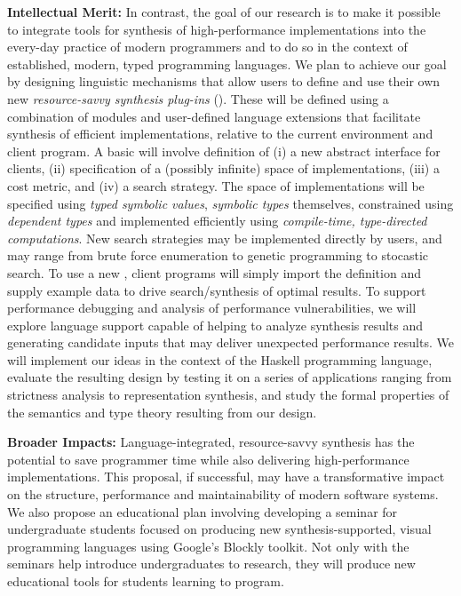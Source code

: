 \documentclass[12pt]{article}
\begin{document}
\noindent
\textbf{Intellectual Merit:}
In contrast, the goal of our research is to make it possible to integrate
tools for synthesis of high-performance implementations into the every-day 
practice of modern programmers and to do so in the context of 
established, modern,
typed programming languages.  We plan to achieve our goal
by designing linguistic mechanisms that allow users to define and use 
their own new \emph{resource-savvy synthesis plug-ins} (\rasps).
These \rasps will be defined using a combination of modules and user-defined
 language extensions that facilitate
synthesis of efficient implementations, relative to the current
environment and client program.  A basic \rasp will involve definition
of (i) a new abstract interface for clients, (ii) specification of a
(possibly infinite) space of implementations, (iii)
a cost metric, and (iv) a search strategy.  The space of implementations
will be specified using \emph{typed symbolic values}, \emph{symbolic types}
themselves, constrained using \emph{dependent types} and implemented 
efficiently using \emph{compile-time, type-directed computations}.  New 
search strategies may be implemented directly by users, and may range from
brute force enumeration to genetic programming to stocastic search.
To use a new \rasp, client programs will simply import the \rasp definition
and supply example data to drive search/synthesis of optimal results.
To support performance debugging and analysis of performance vulnerabilities,
we will explore language support capable of helping to analyze synthesis 
results and generating candidate inputs that may deliver unexpected 
performance results.  We will implement our ideas in the context of the
Haskell programming language, evaluate the resulting design by testing
it on a series of applications ranging from strictness analysis to
representation synthesis, and study the formal properties of the semantics and
type theory resulting from our design.

\noindent
\textbf{Broader Impacts:} 
Language-integrated, resource-savvy synthesis has the potential to
save programmer time while also delivering high-performance implementations.
This proposal, if successful, may have a transformative impact on the
structure, performance and maintainability of modern software systems.
We also propose an educational plan involving developing a seminar for 
undergraduate students focused on producing new synthesis-supported,
visual programming languages using Google's Blockly toolkit.  Not only
with the seminars help introduce undergraduates to research, they will
produce new educational tools for students learning to program.
\end{document}
